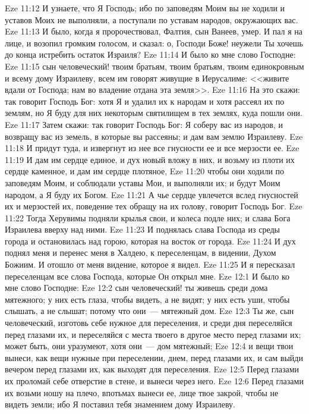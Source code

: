 \vs Eze 11:12 И узнаете, что Я Господь; ибо по заповедям Моим вы не ходили и уставов Моих не выполняли, а поступали по уставам народов, окружающих вас.
\vs Eze 11:13 И было, когда я пророчествовал, Фалтия, сын Ванеев, умер. И пал я на лице, и возопил громким голосом, и сказал: о, Господи Боже! неужели Ты хочешь до конца истребить остаток Израиля?
\rsbpar\vs Eze 11:14 И было ко мне слово Господне:
\vs Eze 11:15 сын человеческий! твоим братьям, твоим братьям, твоим единокровным и всему дому Израилеву, всем им говорят живущие в Иерусалиме: <<живите вдали от Господа; нам во владение отдана эта земля>>.
\vs Eze 11:16 На это скажи: так говорит Господь Бог: хотя Я и удалил их к народам и хотя рассеял их по землям, но Я буду для них некоторым святилищем в тех землях, куда пошли они.
\vs Eze 11:17 Затем скажи: так говорит Господь Бог: Я соберу вас из народов, и возвращу вас из земель, в которые вы рассеяны; и дам вам землю Израилеву.
\vs Eze 11:18 И придут туда, и извергнут из нее все гнусности ее и все мерзости ее.
\vs Eze 11:19 И дам им сердце единое, и дух новый вложу в них, и возьму из плоти их сердце каменное, и дам им сердце плотяное,
\vs Eze 11:20 чтобы они ходили по заповедям Моим, и соблюдали уставы Мои, и выполняли их; и будут Моим народом, а Я буду их Богом.
\vs Eze 11:21 А чье сердце увлечется вслед гнусностей их и мерзостей их, поведение тех обращу на их голову, говорит Господь Бог.
\vs Eze 11:22 Тогда Херувимы подняли крылья свои, и колеса подле них; и слава Бога Израилева вверху над ними.
\vs Eze 11:23 И поднялась слава Господа из среды города и остановилась над горою, которая на восток от города.
\rsbpar\vs Eze 11:24 И дух поднял меня и перенес меня в Халдею, к переселенцам, в видении, Духом Божиим. И отошло от меня видение, которое я видел.
\vs Eze 11:25 И я пересказал переселенцам все слова Господа, которые Он открыл мне.
\vs Eze 12:1 И было ко мне слово Господне:
\vs Eze 12:2 сын человеческий! ты живешь среди дома мятежного; у них есть глаза, чтобы видеть, а не видят; у них есть уши, чтобы слышать, а не слышат; потому что они~--- мятежный дом.
\vs Eze 12:3 Ты же, сын человеческий, изготовь себе нужное для переселения, и среди дня переселяйся перед глазами их, и переселяйся с места твоего в другое место перед глазами их; может быть, они уразумеют, хотя они~--- дом мятежный;
\vs Eze 12:4 и вещи твои вынеси, как вещи нужные при переселении, днем, перед глазами их, и сам выйди вечером перед глазами их, как выходят для переселения.
\vs Eze 12:5 Перед глазами их проломай себе отверстие в стене, и вынеси через него.
\vs Eze 12:6 Перед глазами их возьми ношу на плечо, впотьмах вынеси ее, лице твое закрой, чтобы не видеть земли; ибо Я поставил тебя знамением дому Израилеву.
